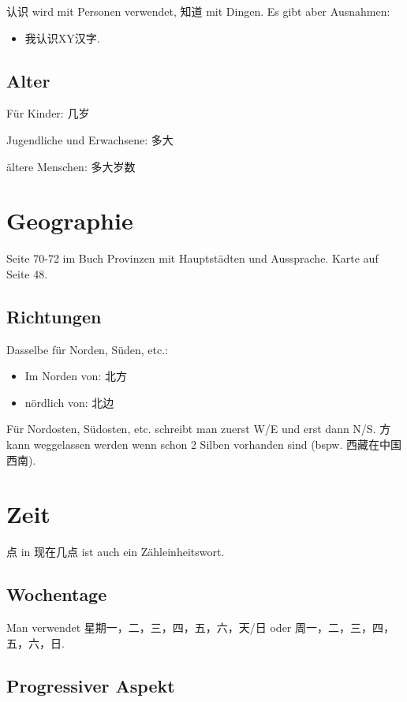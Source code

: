 \documentclass[UTF8]{ctexart}
\begin{document}
认识 wird mit Personen verwendet, 知道 mit Dingen. Es gibt aber Ausnahmen:

\begin{itemize}
    \item 我认识XY汉字.
\end{itemize}

\subsection{Alter}

Für Kinder: 几岁

Jugendliche und Erwachsene: 多大

ältere Menschen: 多大岁数

\section{Geographie}

Seite 70-72 im Buch Provinzen mit Hauptstädten und Aussprache. Karte auf Seite 48.


\subsection{Richtungen}

Dasselbe für Norden, Süden, etc.:

\begin{itemize}
    \item Im Norden von: 北方
    \item nördlich von: 北边
\end{itemize}

Für Nordosten, Südosten, etc. schreibt man zuerst W/E und erst dann N/S. 方 kann weggelassen werden wenn schon 2 Silben vorhanden sind (bspw. 西藏在中国西南).

\section{Zeit}

点 in 现在几点 ist auch ein Zähleinheitswort.

\subsection{Wochentage}

Man verwendet 星期{一，二，三，四，五，六，天/日} oder 周{一，二，三，四，五，六，日}.

\subsection{Progressiver Aspekt}
\end{document}

